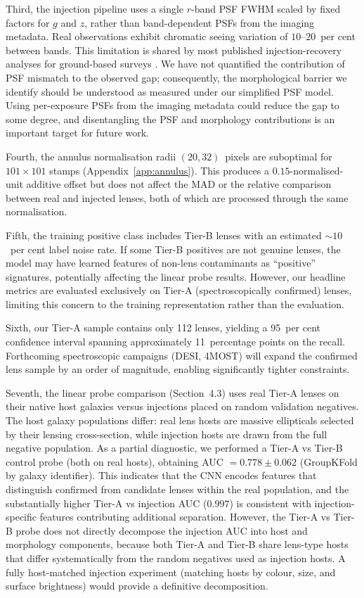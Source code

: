 \documentclass[fleqn,usenatbib]{rasti}
\begin{document}
Third, the injection pipeline uses a single $r$-band PSF FWHM scaled by fixed factors for $g$ and $z$, rather than band-dependent PSFs from the imaging metadata.  Real observations exhibit chromatic seeing variation of $10$--$20$~per cent between bands.  This limitation is shared by most published injection-recovery analyses for ground-based surveys \citep{Herle2024}.  We have not quantified the contribution of PSF mismatch to the observed gap; consequently, the morphological barrier we identify should be understood as measured under our simplified PSF model.  Using per-exposure PSFs from the imaging metadata could reduce the gap to some degree, and disentangling the PSF and morphology contributions is an important target for future work.

Fourth, the annulus normalisation radii $(20, 32)$~pixels are suboptimal for $101 \times 101$ stamps (Appendix~\ref{app:annulus}).  This produces a $0.15$-normalised-unit additive offset but does not affect the MAD or the relative comparison between real and injected lenses, both of which are processed through the same normalisation.

Fifth, the training positive class includes Tier-B lenses with an estimated $\sim\!10$~per cent label noise rate.  If some Tier-B positives are not genuine lenses, the model may have learned features of non-lens contaminants as ``positive'' signatures, potentially affecting the linear probe results.  However, our headline metrics are evaluated exclusively on Tier-A (spectroscopically confirmed) lenses, limiting this concern to the training representation rather than the evaluation.

Sixth, our Tier-A sample contains only 112 lenses, yielding a 95~per cent confidence interval spanning approximately 11~percentage points on the recall.  Forthcoming spectroscopic campaigns (DESI, 4MOST) will expand the confirmed lens sample by an order of magnitude, enabling significantly tighter constraints.

Seventh, the linear probe comparison (Section~4.3) uses real Tier-A lenses on their native host galaxies versus injections placed on random validation negatives.  The host galaxy populations differ: real lens hosts are massive ellipticals selected by their lensing cross-section, while injection hosts are drawn from the full negative population.  As a partial diagnostic, we performed a Tier-A vs Tier-B control probe (both on real hosts), obtaining AUC $= 0.778 \pm 0.062$ (GroupKFold by galaxy identifier).  This indicates that the CNN encodes features that distinguish confirmed from candidate lenses within the real population, and the substantially higher Tier-A vs injection AUC ($0.997$) is consistent with injection-specific features contributing additional separation.  However, the Tier-A vs Tier-B probe does not directly decompose the injection AUC into host and morphology components, because both Tier-A and Tier-B share lens-type hosts that differ systematically from the random negatives used as injection hosts.  A fully host-matched injection experiment (matching hosts by colour, size, and surface brightness) would provide a definitive decomposition.
\end{document}
